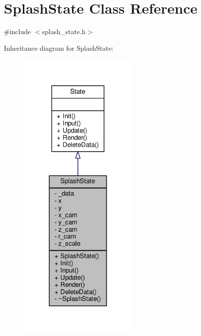 \hypertarget{classSplashState}{}\section{Splash\+State Class Reference}
\label{classSplashState}


{\ttfamily \#include $<$splash\+\_\+state.\+h$>$}



Inheritance diagram for Splash\+State\+:
\nopagebreak
\begin{figure}[H]
\begin{center}
\leavevmode
\includegraphics[width=168pt]{classSplashState__inherit__graph}
\end{center}
\end{figure}


